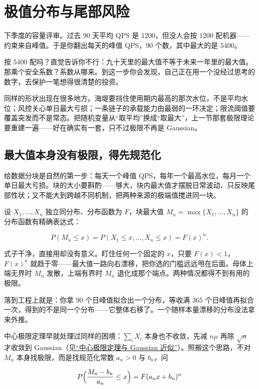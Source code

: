 \section{极值分布与尾部风险}
\label{sec:05-Probability/06-Common-Distributions/08}

下季度的容量评审。过去 \(90\) 天平均 QPS 是 \(1200\)，但没人会按 \(1200\) 配机器——约束来自峰值。于是你翻出每天的峰值 QPS，\(90\) 个数，其中最大的是 \(5400\)。

按 \(5400\) 配吗？直觉告诉你不行：九十天里的最大值不等于未来一年里的最大值。那乘个安全系数？系数从哪来。到这一步你会发现，自己正在用一个没经过思考的数字，去保护一笔想得很清楚的投资。

同样的形状出现在很多地方。海堤要挡住使用期内最高的那次水位，不是平均水位；风控关心单日最大亏损；一条链子的承载能力由最弱的一环决定；限流阈值要覆盖突发而不是常态。把随机变量从``取平均''换成``取最大''，上一节那套极限理论要重建一遍——好在确实有一套，只不过极限不再是 Gaussian。

\subsection{最大值本身没有极限，得先规范化}

给数据分块是自然的第一步：每天一个峰值 QPS，每年一个最高水位，每月一个单日最大亏损。块的大小要斟酌——够大，块内最大值才摆脱日常波动、只反映尾部性状；又不能大到跨越不同机制，把两种来源的极端值搅进同一块。

设 \(X_1,\ldots,X_n\) 独立同分布、分布函数为 \(F\)，块最大值 \(M_n=\max\{X_1,\ldots,X_n\}\) 的分布函数有精确表达式：

\[
P(M_n\le x)=P(X_1\le x,\ldots,X_n\le x)=F(x)^n .
\]

式子干净，直接用却没有意义。盯住任何一个固定的 \(x\)，只要 \(F(x)<1\)，\(F(x)^n\) 就趋于零——最大值一路向右漂移，把你选的门槛远远甩在后面。母体上端无界时 \(M_n\) 发散，上端有界时 \(M_n\) 退化成那个端点。两种情况都得不到有用的极限。

落到工程上就是：你拿 \(90\) 个日峰值拟合出一个分布，等收满 \(365\) 个日峰值再拟合一次，得到的不是同一个分布——它整体右移了。一个随样本量漂移的分布没法拿来外推。

中心极限定理早就处理过同样的困境：\(\sum_i X_i\) 本身也不收敛，先减 \(n\mu\) 再除 \(\sqrt n\) 才收敛到 Gaussian（见\hyperref[sec:05-Probability/08-Limit-Theorems/03]{``中心极限定理与 Gaussian 近似''}）。照搬这个思路，不对 \(M_n\) 本身找极限，而是找规范化常数 \(a_n>0\) 与 \(b_n\)，问

\[
P\Bigl(\frac{M_n-b_n}{a_n}\le x\Bigr)=F(a_nx+b_n)^n
\]

